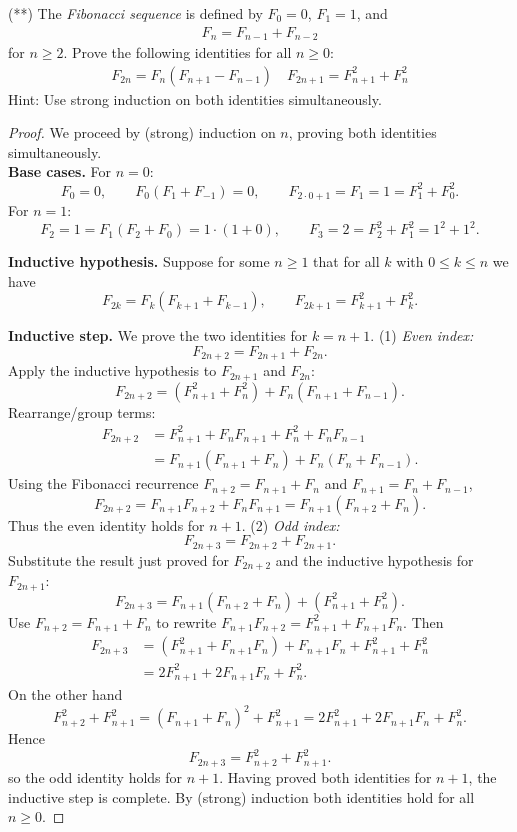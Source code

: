 \documentclass[12pt]{article}
\begin{document}
\begin{problem}
(**) The \emph{Fibonacci sequence} is defined by $F_0 = 0$, $F_1 = 1$, and
\begin{align*}
    F_n = F_{n-1} + F_{n-2}
\end{align*}
for $n \geq 2$. Prove the following identities for all $n \geq 0$:
\begin{align*}
    F_{2n} = F_n(F_{n+1} - F_{n-1}) \quad
    F_{2n+1} = F_{n+1}^2 + F_n^2
\end{align*}
Hint: Use strong induction on both identities simultaneously.

\begin{proof}
We proceed by (strong) induction on $n$, proving both identities
simultaneously. \\
\textbf{Base cases.} For $n=0$:
\[
F_{0}=0,\qquad F_0(F_{1}+F_{-1})=0, \qquad
F_{2\cdot 0+1}=F_1=1=F_1^2+F_0^2.
\]
For $n=1$:
\[
F_2=1=F_1(F_2+F_0)=1\cdot(1+0), \qquad
F_3=2=F_2^2+F_1^2=1^2+1^2.
\]

\textbf{Inductive hypothesis.} Suppose for some $n\ge 1$ that for all $k$ with
$0\le k\le n$ we have
\[
F_{2k}=F_k(F_{k+1}+F_{k-1}),\qquad
F_{2k+1}=F_{k+1}^2+F_k^2.
\]

\textbf{Inductive step.} We prove the two identities for $k=n+1$.
(1) \emph{Even index:}
\[
F_{2n+2}=F_{2n+1}+F_{2n}.
\]
Apply the inductive hypothesis to $F_{2n+1}$ and $F_{2n}$:
\[
F_{2n+2}=(F_{n+1}^2+F_n^2)+F_n(F_{n+1}+F_{n-1}).
\]
Rearrange/group terms:
\begin{align*}
F_{2n+2}
&=F_{n+1}^2+F_nF_{n+1}+F_n^2+F_nF_{n-1} \\
&=F_{n+1}(F_{n+1}+F_n)+F_n(F_n+F_{n-1}).
\end{align*}
Using the Fibonacci recurrence $F_{n+2}=F_{n+1}+F_n$ and $F_{n+1}=F_n+F_{n-1}$,
\[
F_{2n+2}=F_{n+1}F_{n+2}+F_nF_{n+1}=F_{n+1}(F_{n+2}+F_n).
\]
Thus the even identity holds for $n+1$. (2) \emph{Odd index:}
\[
F_{2n+3}=F_{2n+2}+F_{2n+1}.
\]
Substitute the result just proved for $F_{2n+2}$ and the inductive hypothesis for
$F_{2n+1}$:
\[
F_{2n+3}=F_{n+1}(F_{n+2}+F_n)+(F_{n+1}^2+F_n^2).
\]
Use $F_{n+2}=F_{n+1}+F_n$ to rewrite $F_{n+1}F_{n+2}=F_{n+1}^2+F_{n+1}F_n$.
Then
\[
\begin{aligned}
F_{2n+3}
&= (F_{n+1}^2+F_{n+1}F_n)+F_{n+1}F_n+F_{n+1}^2+F_n^2 \\
&= 2F_{n+1}^2+2F_{n+1}F_n+F_n^2.
\end{aligned}
\]
On the other hand
\[
F_{n+2}^2+F_{n+1}^2=(F_{n+1}+F_n)^2+F_{n+1}^2
=2F_{n+1}^2+2F_{n+1}F_n+F_n^2.
\]
Hence
\[
F_{2n+3}=F_{n+2}^2+F_{n+1}^2.
\]
so the odd identity holds for $n+1$. Having proved both identities for $n+1$, the inductive step is complete. By (strong) induction both identities hold for all $n\ge 0$.
\end{proof}
\end{problem}
\end{document}
